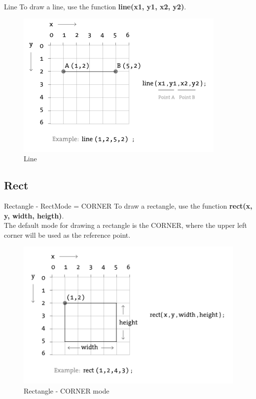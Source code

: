 \documentclass{beamer}
\begin{document}
\begin{frame}{Line}
To draw a line, use the function \textbf{line(x1, y1, x2, y2)}.

\begin{figure}[H]
\centerline{\includegraphics[scale=0.5]{line.png}}
\caption{Line}
\end{figure}
\end{frame}

\subsection{Rect}

\begin{frame}{Rectangle - RectMode = CORNER}
To draw a rectangle, use the function \textbf{rect(x, y, width, heigth)}.\\
The default mode for drawing a rectangle is the CORNER, where the upper
left corner will be used as the reference point.\\

\begin{figure}[H]
\centerline{\includegraphics[scale=0.5]{rectangle_corner_mode.png}}
\caption{Rectangle - CORNER mode}
\end{figure}
\end{frame}
\end{document}
